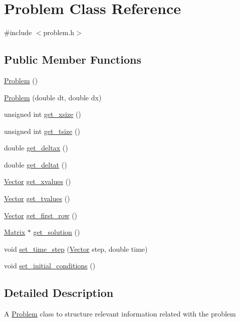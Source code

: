 \hypertarget{classProblem}{}\section{Problem Class Reference}
\label{classProblem}


{\ttfamily \#include $<$problem.\+h$>$}

\subsection*{Public Member Functions}
\begin{DoxyCompactItemize}
\item 
\hyperlink{classProblem_ad9d44f0ef936fb62f0ce41dd200494ac}{Problem} ()
\item 
\hyperlink{classProblem_a2bd30352a90746e7b2c8233c59536259}{Problem} (double dt, double dx)
\item 
unsigned int \hyperlink{classProblem_af09d12c75d48d233c0e6b34266440a96}{get\+\_\+xsize} ()
\item 
unsigned int \hyperlink{classProblem_a2f4ee1a3e797fe66181d7f62a3191366}{get\+\_\+tsize} ()
\item 
double \hyperlink{classProblem_ae4d3597c10075ce871795528a34f1b0a}{get\+\_\+deltax} ()
\item 
double \hyperlink{classProblem_a5237b5ed257f9fae244573b64bea0c95}{get\+\_\+deltat} ()
\item 
\hyperlink{classVector}{Vector} \hyperlink{classProblem_a24f804792a0f5e30816a79cbbdb4c561}{get\+\_\+xvalues} ()
\item 
\hyperlink{classVector}{Vector} \hyperlink{classProblem_ad9471629841ec6bd734d398ed9bfa624}{get\+\_\+tvalues} ()
\item 
\hyperlink{classVector}{Vector} \hyperlink{classProblem_af17e4443d0bf9b347f5d2765eb235412}{get\+\_\+first\+\_\+row} ()
\item 
\hyperlink{classMatrix}{Matrix} $\ast$ \hyperlink{classProblem_ac4e50f2308eef0abbe17446a9763b5be}{get\+\_\+solution} ()
\item 
void \hyperlink{classProblem_ac383070ca94c0da306bbcfbde061183a}{set\+\_\+time\+\_\+step} (\hyperlink{classVector}{Vector} step, double time)
\item 
void \hyperlink{classProblem_a3bc203645a0d259f21586b55d239ee88}{set\+\_\+initial\+\_\+conditions} ()
\end{DoxyCompactItemize}


\subsection{Detailed Description}
A \hyperlink{classProblem}{Problem} class to structure relevant information related with the problem

